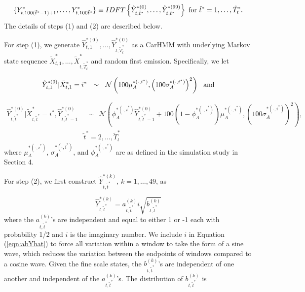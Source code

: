 \[
    \{Y^*_{t,100(\tilde t^* - 1) + 1},\ldots,Y^*_{t,100\tilde t^*}\} \equiv IDFT\left\{\hat{Y}^{*(0)}_{t,\tilde t^*},
    \ldots, \hat{Y}^{*(99)}_{t,\tilde t^*}\right\}
    {\rm{~for~}} \tilde t^* = 1,\ldots,\tilde T^*_t.
\]
The details of steps (1) and (2) are described below.

For step (1), we generate $\hat Y^{*(0)}_{t,1}, \ldots, \hat Y^{*(0)}_{t,\tilde T_t^*}$ as a CarHMM with underlying Markov state sequence $\tilde X^{*}_{t,1}, \ldots, \tilde X^{*}_{t,\tilde T_t^*}$ and random first emission. Specifically, we let

   \[
    	\hat{Y}^{*(0)}_{t,1}|\tilde X^*_{t,1} = i^* ~~\sim~~ \mathcal{N} \left(100 \mu^{*(\cdot,i^*)}_A, \left(100\sigma_A^{*(\cdot,i^*)}\right)^2 \right)
    	~~{\rm{and}}
   \]
   
    \begin{align}	
       \hat{Y}^{*(0)}_{t,\tilde t^*}|\tilde X^*_{t,\tilde t^*} = i^*,\hat{Y}^{*(0)}_{t,\tilde t^*-1}
       &~~\sim ~~\mathcal{N} \left(\phi_A^{*(\cdot,i^*)} \hat{Y}^{*(0)}_{t,\tilde t^*-1} + 100(1-\phi_A^{*(\cdot,i^*)}) \mu^{*(\cdot,i^*)}_A, \left(100\sigma_A^{*(\cdot,i^*)}\right)^2 \right), \label{eqn:yhat_0} \\
        &\tilde t^* = 2,\ldots, \tilde T^*_t
    	\nonumber
    \end{align}
    where $\mu_A^{*(\cdot,i^*)}$, $\sigma_A^{*(\cdot,i^*)}$, and $\phi_A^{*(\cdot,i^*)}$ are as defined in the simulation study in Section 4.
  
 For step (2),
 we first construct $\hat{Y}^{*(k)}_{t,\tilde t^*}$, $k=1,\ldots, 49$, as
 
    \begin{equation}
        \hat{Y}^{*(k)}_{t,\tilde t^*} = a_{t,\tilde t^*}^{(k)} i\sqrt{b^{(k)}_{t,\tilde t^*}}
        \label{eqn:abYhat}
    \end{equation}
    where the $a^{(k)}_{t,\tilde t^*}$'s are independent and equal to either 1 or -1 each with probability 1/2 and $i$ is the imaginary number. We include $i$ in Equation (\ref{eqn:abYhat}) to force all variation within a window to take the form of a sine wave, which reduces the variation between the endpoints of windows compared to a cosine wave.
    Given the fine scale states, the $b^{(k)}_{t,\tilde t^*}$'s are independent of one another and independent of the $a^{(k)}_{t,\tilde t^*}$'s.  
   The distribution of $b^{(k)}_{t,\tilde t^*}$ is
   
